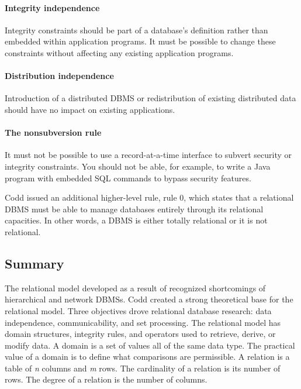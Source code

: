 \documentclass[
]{article}
\begin{document}
\hypertarget{integrity-independence}{%
\paragraph*{Integrity independence}\label{integrity-independence}}

Integrity constraints should be part of a database's definition rather
than embedded within application programs. It must be possible to change
these constraints without affecting any existing application programs.

\hypertarget{distribution-independence}{%
\paragraph*{Distribution independence}\label{distribution-independence}}

Introduction of a distributed DBMS or redistribution of existing
distributed data should have no impact on existing applications.

\hypertarget{the-nonsubversion-rule}{%
\paragraph*{The nonsubversion rule}\label{the-nonsubversion-rule}}

It must not be possible to use a record-at-a-time interface to subvert
security or integrity constraints. You should not be able, for example,
to write a Java program with embedded SQL commands to bypass security
features.

Codd issued an additional higher-level rule, rule 0, which states that a
relational DBMS must be able to manage databases entirely through its
relational capacities. In other words, a DBMS is either totally
relational or it is not relational.

\hypertarget{summary-9}{%
\subsection*{Summary}\label{summary-9}}

The relational model developed as a result of recognized shortcomings of
hierarchical and network DBMSs. Codd created a strong theoretical base
for the relational model. Three objectives drove relational database
research: data independence, communicability, and set processing. The
relational model has domain structures, integrity rules, and operators
used to retrieve, derive, or modify data. A domain is a set of values
all of the same data type. The practical value of a domain is to define
what comparisons are permissible. A relation is a table of \emph{n} columns
and \emph{m} rows. The cardinality of a relation is its number of rows. The
degree of a relation is the number of columns.
\end{document}
